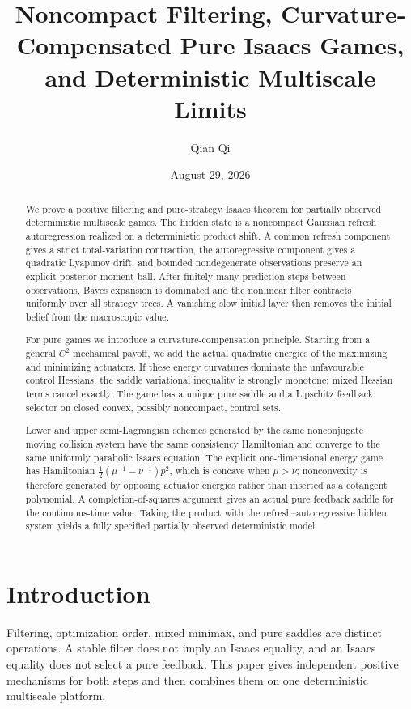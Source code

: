 \documentclass[11pt,reqno]{amsart}
\title[Noncompact filtering and pure Isaacs limits]{Noncompact Filtering, Curvature-Compensated Pure Isaacs Games, and Deterministic Multiscale Limits}
\author{Qian Qi}
\date{August 29, 2026}
\theoremstyle{definition}
\theoremstyle{remark}
\begin{document}
\begin{abstract}
We prove a positive filtering and pure-strategy Isaacs theorem for partially
observed deterministic multiscale games.  The hidden state is a noncompact
Gaussian refresh--autoregression realized on a deterministic product shift.  A
common refresh component gives a strict total-variation contraction, the
autoregressive component gives a quadratic Lyapunov drift, and bounded
nondegenerate observations preserve an explicit posterior moment ball.  After
finitely many prediction steps between observations, Bayes expansion is
dominated and the nonlinear filter contracts uniformly over all strategy
trees.  A vanishing slow initial layer then removes the initial belief from the
macroscopic value.

For pure games we introduce a curvature-compensation principle.  Starting from
a general $C^2$ mechanical payoff, we add the actual quadratic energies of the
maximizing and minimizing actuators.  If these energy curvatures dominate the
unfavourable control Hessians, the saddle variational inequality is strongly
monotone; mixed Hessian terms cancel exactly.  The game has a unique pure
saddle and a Lipschitz feedback selector on closed convex, possibly
noncompact, control sets.

Lower and upper semi-Lagrangian schemes generated by the same nonconjugate
moving collision system have the same consistency Hamiltonian and converge to
the same uniformly parabolic Isaacs equation.  The explicit one-dimensional
energy game has Hamiltonian
$\frac12(\mu^{-1}-\nu^{-1})p^2$, which is concave when $\mu>\nu$; nonconvexity
is therefore generated by opposing actuator energies rather than inserted as a
cotangent polynomial.  A completion-of-squares argument gives an actual pure
feedback saddle for the continuous-time value.  Taking the product with the
refresh--autoregressive hidden system yields a fully specified partially
observed deterministic model.
\end{abstract}

\maketitle
\tableofcontents

\section{Introduction}

Filtering, optimization order, mixed minimax, and pure saddles are distinct
operations.  A stable filter does not imply an Isaacs equality, and an Isaacs
equality does not select a pure feedback.  This paper gives independent
positive mechanisms for both steps and then combines them on one deterministic
multiscale platform.
\end{document}
